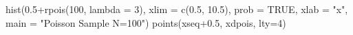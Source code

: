 \begin{Schunk}
\begin{Sinput}
   hist(0.5+rpois(100, lambda = 3), xlim = c(0.5, 10.5), prob = TRUE, xlab = "x", main = "Poisson Sample N=100")
   points(xseq+0.5, xdpois, lty=4)
\end{Sinput}
\end{Schunk}
